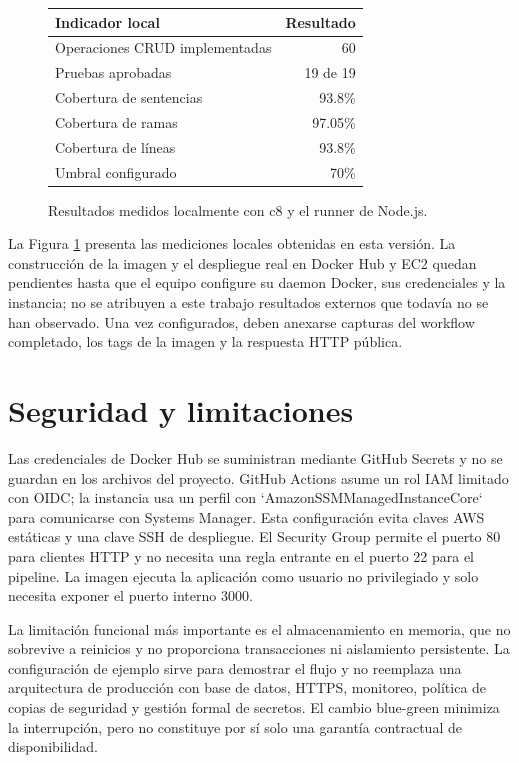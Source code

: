 \documentclass[12pt,letterpaper]{article}
\begin{document}
\begin{figure}[H]
\centering
\begin{tabular}{lr}
\toprule
\textbf{Indicador local} & \textbf{Resultado} \\
\midrule
Operaciones CRUD implementadas & 60 \\
Pruebas aprobadas & 19 de 19 \\
Cobertura de sentencias & 93.8\% \\
Cobertura de ramas & 97.05\% \\
Cobertura de líneas & 93.8\% \\
Umbral configurado & 70\% \\
\bottomrule
\end{tabular}
\caption{Resultados medidos localmente con c8 y el runner de Node.js.}
\label{fig:resultados}
\end{figure}
La Figura \ref{fig:resultados} presenta las mediciones locales obtenidas en esta versión. La construcción de la imagen y el despliegue real en Docker Hub y EC2 quedan pendientes hasta que el equipo configure su daemon Docker, sus credenciales y la instancia; no se atribuyen a este trabajo resultados externos que todavía no se han observado. Una vez configurados, deben anexarse capturas del workflow completado, los tags de la imagen y la respuesta HTTP pública.

\section{Seguridad y limitaciones}
Las credenciales de Docker Hub se suministran mediante GitHub Secrets y no se guardan en los archivos del proyecto. GitHub Actions asume un rol IAM limitado con OIDC; la instancia usa un perfil con `AmazonSSMManagedInstanceCore` para comunicarse con Systems Manager. Esta configuración evita claves AWS estáticas y una clave SSH de despliegue. El Security Group permite el puerto 80 para clientes HTTP y no necesita una regla entrante en el puerto 22 para el pipeline. La imagen ejecuta la aplicación como usuario no privilegiado y solo necesita exponer el puerto interno 3000.

La limitación funcional más importante es el almacenamiento en memoria, que no sobrevive a reinicios y no proporciona transacciones ni aislamiento persistente. La configuración de ejemplo sirve para demostrar el flujo y no reemplaza una arquitectura de producción con base de datos, HTTPS, monitoreo, política de copias de seguridad y gestión formal de secretos. El cambio blue-green minimiza la interrupción, pero no constituye por sí solo una garantía contractual de disponibilidad.
\end{document}
